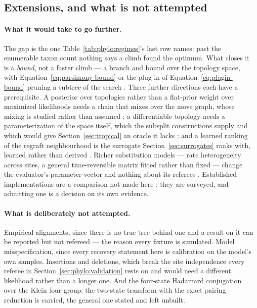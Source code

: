 \documentclass[11pt,a4paper]{article}
\begin{document}
\subsection{Extensions, and what is not attempted}
\label{sec:phylo:extensions}
\paragraph{What it would take to go further.}
The gap is the one Table~\ref{tab:phylo:regimes}'s last row names: past the
enumerable taxon count nothing says a climb found the optimum. What closes it
is a \emph{bound}, not a faster climb --- a branch and bound over the topology
space, with Equation~\ref{eq:parsimony-bound} or the plug-in of
Equation~\ref{eq:plugin-bound} pruning a subtree of the search
\citep{papadimitriou1998}. Three further directions each have a prerequisite. A
posterior over topologies rather than a flat-prior weight over maximized
likelihoods needs a chain that mixes over the move graph, whose mixing is
studied rather than assumed \citep{whidden2015, altekar2004}; a differentiable
topology needs a parameterization of the space itself, which the subsplit
constructions supply and which would give Section~\ref{sec:tropical} an oracle
it lacks \citep{zhang2018, zhang2019}; and a learned ranking of the regraft
neighbourhood is the surrogate Section~\ref{sec:surrogates} ranks with, learned
rather than derived \citep{azouri2021}. Richer substitution models --- rate
heterogeneity across sites, a general time-reversible matrix fitted rather than
fixed --- change the evaluator's parameter vector and nothing about its
referees \citep{yang2014}. Established implementations are a comparison not
made here \citep{minh2020, kozlov2019}: they are surveyed, and admitting one is
a decision on its own evidence.

\paragraph{What is deliberately not attempted.}
Empirical alignments, since there is no true tree behind one and a result on it
can be reported but not refereed --- the reason every fixture is simulated.
Model misspecification, since every recovery statement here is calibration on
the model's own samples. Insertions and deletions, which break the site
independence every referee in Section~\ref{sec:phylo:validation} rests on and
would need a different likelihood rather than a longer one. And the four-state
Hadamard conjugation over the Klein four-group: the two-state transform with
the exact pairing reduction is carried, the general one stated and left
unbuilt.
\end{document}
